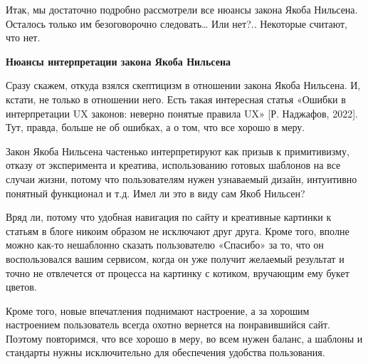 Итак, мы достаточно подробно рассмотрели все нюансы закона Якоба Нильсена. Осталось только им безоговорочно следовать… Или нет?.. Некоторые считают, что нет.


\textbf{Нюансы интерпретации закона Якоба Нильсена}

Сразу скажем, откуда взялся скептицизм в отношении закона Якоба Нильсена. И, кстати, не только в отношении него. Есть такая интересная статья «Ошибки в интерпретации UX законов: неверно понятые правила UX» [Р. Наджафов, 2022]. Тут, правда, больше не об ошибках, а о том, что все хорошо в меру.

Закон Якоба Нильсена частенько интерпретируют как призыв к примитивизму, отказу от эксперимента и креатива, использованию готовых шаблонов на все случаи жизни, потому что пользователям нужен узнаваемый дизайн, интуитивно понятный функционал и т.д. Имел ли это в виду сам Якоб Нильсен?

Вряд ли, потому что удобная навигация по сайту и креативные картинки к статьям в блоге никоим образом не исключают друг друга. Кроме того, вполне можно как-то нешаблонно сказать пользователю «Спасибо» за то, что он воспользовался вашим сервисом, когда он уже получит желаемый результат и точно не отвлечется от процесса на картинку с котиком, вручающим ему букет цветов.

Кроме того, новые впечатления поднимают настроение, а за хорошим настроением пользователь всегда охотно вернется на понравившийся сайт. Поэтому повторимся, что все хорошо в меру, во всем нужен баланс, а шаблоны и стандарты нужны исключительно для обеспечения удобства пользования.